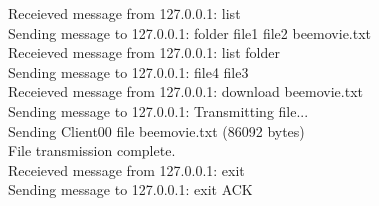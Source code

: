\documentclass{article}
\begin{document}
{Receieved message from 127.0.0.1: list\\
Sending message to 127.0.0.1: folder file1 file2 beemovie.txt\\
Receieved message from 127.0.0.1: list folder\\
Sending message to 127.0.0.1: file4 file3\\
Receieved message from 127.0.0.1: download beemovie.txt\\
Sending message to 127.0.0.1: Transmitting file...\\
Sending Client00 file beemovie.txt (86092 bytes)\\
File transmission complete.\\
Receieved message from 127.0.0.1: exit\\
Sending message to 127.0.0.1: exit ACK}
\end{document}
